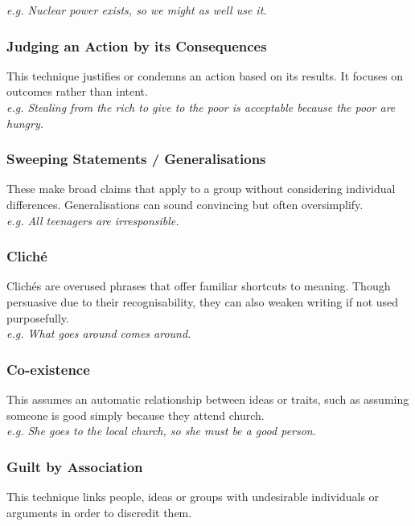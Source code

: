 \documentclass[a4paper]{article}
\begin{document}
\textit{e.g. Nuclear power exists, so we might as well use it.}\\

\subsubsection{Judging an Action by its Consequences}
This technique justifies or condemns an action based on its results. It focuses on outcomes rather than intent.\\

\textit{e.g. Stealing from the rich to give to the poor is acceptable because the poor are hungry.}\\

\subsubsection{Sweeping Statements / Generalisations}
These make broad claims that apply to a group without considering individual differences. Generalisations can sound convincing but often oversimplify.\\

\textit{e.g. All teenagers are irresponsible.}\\

\subsubsection{Cliché}
Clichés are overused phrases that offer familiar shortcuts to meaning. Though persuasive due to their recognisability, they can also weaken writing if not used purposefully.\\

\textit{e.g. What goes around comes around.}\\

\subsubsection{Co-existence}
This assumes an automatic relationship between ideas or traits, such as assuming someone is good simply because they attend church.\\

\textit{e.g. She goes to the local church, so she must be a good person.}\\

\subsubsection{Guilt by Association}
This technique links people, ideas or groups with undesirable individuals or arguments in order to discredit them.\\
\end{document}
